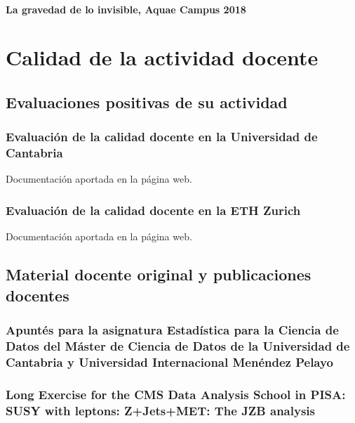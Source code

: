 \documentclass[a4paper, 11pt, twoside, openright]{report}
\begin{document}
\paragraph{La gravedad de lo invisible, Aquae Campus 2018} 


\section{Calidad de la actividad docente}

\subsection{Evaluaciones positivas de su actividad}

\subsubsection{Evaluación de la calidad docente en la Universidad de Cantabria}
%
Documentación aportada en la página web.

\subsubsection{Evaluación de la calidad docente en la ETH Zurich}
%
Documentación aportada en la página web.

\subsection{Material docente original y publicaciones docentes}

\subsubsection{Apuntés para la asignatura Estadística para la Ciencia de Datos del Máster de Ciencia de Datos de la Universidad de Cantabria y Universidad Internacional Menéndez Pelayo}


\subsubsection{Long Exercise for the CMS Data Analysis School in PISA: SUSY with leptons: Z+Jets+MET: The JZB analysis}

\end{document}
